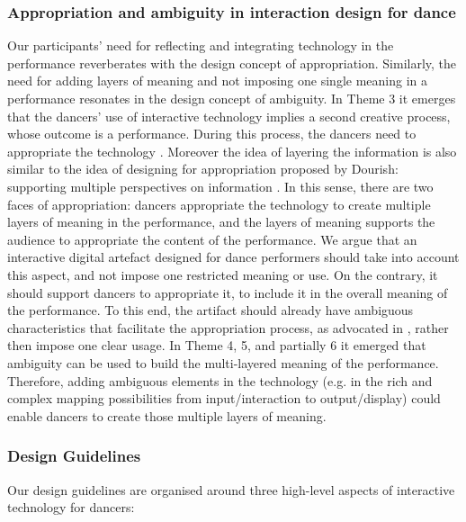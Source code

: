 \subsubsection{Appropriation and ambiguity in interaction design for dance} 

Our participants' need for reflecting and integrating technology in the performance reverberates with the design concept of appropriation. Similarly, the need for adding layers of meaning and not imposing one single meaning in a performance resonates in the design concept of ambiguity. 
In Theme 3 it emerges that the dancers' use of interactive technology implies a second creative process, whose outcome is a performance. During this process, the dancers need to appropriate the technology \cite{dix2007designing}. Moreover the idea of layering the information is also similar to the idea of designing for appropriation proposed by Dourish: supporting multiple perspectives on information \cite{dourish2003appropriation}. 
In this sense, there are two faces of appropriation: dancers { appropriate} the technology to create multiple layers of meaning in the performance, and the layers of meaning supports the audience to { appropriate} the content of the performance. 
We argue that an interactive digital  artefact designed for dance performers should take into account this aspect, and not impose one restricted meaning or use. On the contrary, it should support dancers to appropriate it, to include it in the overall meaning of the performance. To this end, the artifact should already have ambiguous characteristics that facilitate the appropriation process, as advocated in \cite{gaver2003ambiguity}, rather then impose one clear usage. In Theme 4, 5, and partially 6 it emerged that ambiguity can be used to build the multi-layered meaning of the performance. Therefore, adding ambiguous elements in the technology (e.g. in the rich and complex mapping possibilities  from input/interaction to output/display) could enable dancers to create those multiple layers of meaning. %

\subsubsection{Design Guidelines} Our design guidelines are organised around three high-level aspects of interactive technology for dancers:


